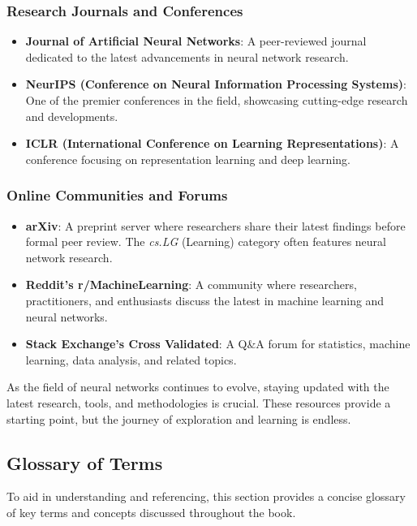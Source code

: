 \subsubsection{Research Journals and Conferences}

\begin{itemize}
    \item \textbf{Journal of Artificial Neural Networks}: A peer-reviewed journal dedicated to the latest advancements in neural network research.
    \item \textbf{NeurIPS (Conference on Neural Information Processing Systems)}: One of the premier conferences in the field, showcasing cutting-edge research and developments.
    \item \textbf{ICLR (International Conference on Learning Representations)}: A conference focusing on representation learning and deep learning.
\end{itemize}

\subsubsection{Online Communities and Forums}

\begin{itemize}
    \item \textbf{arXiv}: A preprint server where researchers share their latest findings before formal peer review. The \textit{cs.LG} (Learning) category often features neural network research.
    \item \textbf{Reddit's r/MachineLearning}: A community where researchers, practitioners, and enthusiasts discuss the latest in machine learning and neural networks.
    \item \textbf{Stack Exchange's Cross Validated}: A Q\&A forum for statistics, machine learning, data analysis, and related topics.
\end{itemize}

As the field of neural networks continues to evolve, staying updated with the latest research, tools, and methodologies is crucial. These resources provide a starting point, but the journey of exploration and learning is endless.

\subsection{Glossary of Terms}

To aid in understanding and referencing, this section provides a concise glossary of key terms and concepts discussed throughout the book.

